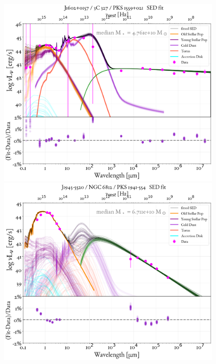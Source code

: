\begin{figure}
    \centering
    \includegraphics[width=0.85\linewidth]{figures/ResultFits/67_SEDfit_4596.png}\\
    \includegraphics[width=0.85\linewidth]{figures/ResultFits/72_SEDfit_4721.png}   
\end{figure}
